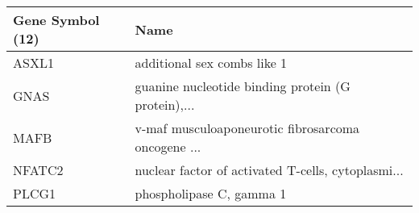 \begin{tabular}{ll}
\toprule
Gene Symbol (12) &                                               Name \\
\midrule
           ASXL1 &                        additional sex combs like 1 \\
            GNAS & guanine nucleotide binding protein (G protein),... \\
            MAFB & v-maf musculoaponeurotic fibrosarcoma oncogene ... \\
          NFATC2 & nuclear factor of activated T-cells, cytoplasmi... \\
           PLCG1 &                           phospholipase C, gamma 1 \\
\bottomrule
\end{tabular}
